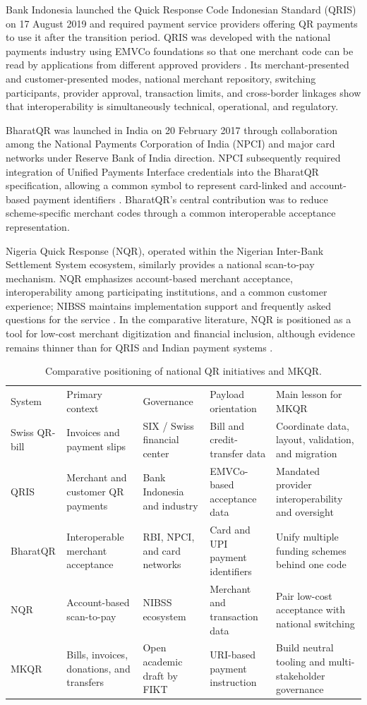 Bank Indonesia launched the Quick Response Code Indonesian Standard (QRIS) on 17 August 2019 and required payment service providers offering QR payments to use it after the transition period. QRIS was developed with the national payments industry using EMVCo foundations so that one merchant code can be read by applications from different approved providers \cite{bankindonesiaqris}. Its merchant-presented and customer-presented modes, national merchant repository, switching participants, provider approval, transaction limits, and cross-border linkages show that interoperability is simultaneously technical, operational, and regulatory.

BharatQR was launched in India on 20 February 2017 through collaboration among the National Payments Corporation of India (NPCI) and major card networks under Reserve Bank of India direction. NPCI subsequently required integration of Unified Payments Interface credentials into the BharatQR specification, allowing a common symbol to represent card-linked and account-based payment identifiers \cite{npcibharatqr}. BharatQR's central contribution was to reduce scheme-specific merchant codes through a common interoperable acceptance representation.

Nigeria Quick Response (NQR), operated within the Nigerian Inter-Bank Settlement System ecosystem, similarly provides a national scan-to-pay mechanism. NQR emphasizes account-based merchant acceptance, interoperability among participating institutions, and a common customer experience; NIBSS maintains implementation support and frequently asked questions for the service \cite{nibssnqr}. In the comparative literature, NQR is positioned as a tool for low-cost merchant digitization and financial inclusion, although evidence remains thinner than for QRIS and Indian payment systems \cite{asrihapsari2025}.

\begin{table}
\caption{Comparative positioning of national QR initiatives and MKQR.}
\begin{tabular}{lllll}
System & Primary context & Governance & Payload orientation & Main lesson for MKQR \\
Swiss QR-bill & Invoices and payment slips & SIX / Swiss financial center & Bill and credit-transfer data & Coordinate data, layout, validation, and migration \\
QRIS & Merchant and customer QR payments & Bank Indonesia and industry & EMVCo-based acceptance data & Mandated provider interoperability and oversight \\
BharatQR & Interoperable merchant acceptance & RBI, NPCI, and card networks & Card and UPI payment identifiers & Unify multiple funding schemes behind one code \\
NQR & Account-based scan-to-pay & NIBSS ecosystem & Merchant and transaction data & Pair low-cost acceptance with national switching \\
MKQR & Bills, invoices, donations, and transfers & Open academic draft by FIKT & URI-based payment instruction & Build neutral tooling and multi-stakeholder governance \\
\end{tabular}
\end{table}

